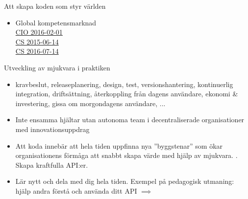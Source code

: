 \begin{SlideExtra}{Att skapa koden som styr världen}
\begin{multicols}{2}
\begin{itemize}
\item Global kompetensmarknad \\
  \href{https://cio.idg.se/2.1782/1.648294/hitta-it-kompetens/sida/2/global-rekrytering-aktivt-hr-arbete}{CIO 2016-02-01}\\
  \href{http://computersweden.idg.se/2.2683/1.630901/det-finns-programmerare-och-sa-finns-det-programmerare}{CS 2015-06-14} \\
  \href{http://computersweden.idg.se/2.2683/1.662186/25-miljoner-utvecklare?queryText=miljoner\%20utvecklare}{CS 2016-07-14 }
\end{itemize}
\end{multicols}

\end{SlideExtra}

\begin{SlideExtra}{Utveckling av mjukvara i praktiken}
\begin{itemize}
\item {} kravbeslut, releaseplanering, design, test, versionshantering, kontinuerlig integration, driftsättning, återkoppling från dagens användare, ekonomi \& investering, gissa om morgondagens användare, ...
\item {} Inte ensamma hjältar utan autonoma team i decentraliserade organisationer med innovationsuppdrag
\item {} Att koda innebär att hela tiden uppfinna nya ''byggstenar'' som ökar organisationens förmåga att snabbt skapa värde med hjälp av mjukvara. . Skapa kraftfulla API:er.
\item {} Lär nytt och dela med dig hela tiden. Exempel på pedagogisk utmaning: hjälp andra förstå och använda ditt API $\implies$ 
\end{itemize}
\end{SlideExtra}


\fi %




\ifkompendium\else
{}
\fi

